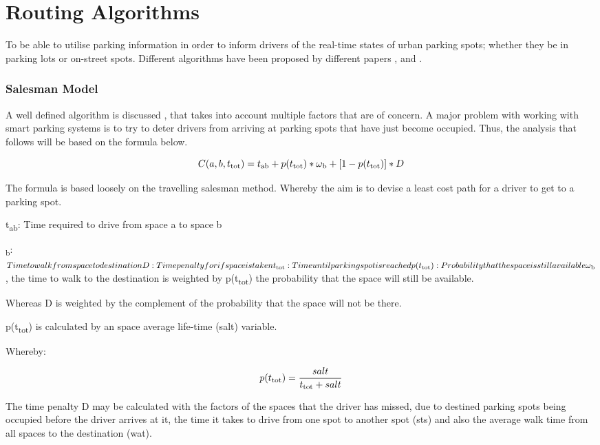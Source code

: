 \section{Routing Algorithms}
To be able to utilise parking information in order to inform drivers of the real-time states of urban parking spots; whether they be in parking lots or on-street spots. Different algorithms have been proposed by different papers \cite{4}, \cite{6} and \cite{7}.

\subsubsection{Salesman Model}
A well defined algorithm is discussed \cite{6}, that takes into account multiple factors that are of concern. A major problem with working with smart parking systems is to try to deter drivers from arriving at parking spots that have just become occupied. Thus, the analysis that follows will be based on the formula below.

\[ C(a,b,t\textsubscript{tot}) = t\textsubscript{ab} + p(t\textsubscript{tot}) * \omega\textsubscript{b} + [1 - p(t\textsubscript{tot})] * D\]

The formula is based loosely on the travelling salesman method. Whereby the aim is to devise a least cost path for a driver to get to a parking spot.

t\textsubscript{ab}: Time required to drive from space a to space b

\omega\textsubscript{b}: $ Time to walk from space to destination

D: Time penalty for if space is taken

t\textsubscript{tot}: Time until parking spot is reached

p(t\textsubscript{tot}): Probability that the space is still available

\omega\textsubscript{b} $, the time to walk to the destination is weighted by p(t\textsubscript{tot}) the probability that the space will still be available.

Whereas D is weighted by the complement of the probability that the space will not be there.

p(t\textsubscript{tot}) is calculated by an space average life-time (salt) variable. 

Whereby: 

\[ p(t\textsubscript{tot}) = \frac{salt}{t\textsubscript{tot} + salt} \]

The time penalty D may be calculated with the factors of the spaces that the driver has missed, due to destined parking spots being occupied before the driver arrives at it, the time it takes to drive from one spot to another spot (sts) and also the average walk time from all spaces to the destination (wat).

